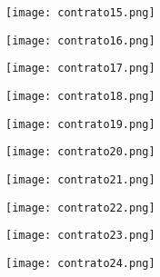 \documentclass[12pt, spanish]{article}
\begin{document}
\begin{centering}\texttt{[image: contrato15.png]}\\[1.0 cm]\end{centering}
\begin{centering}\texttt{[image: contrato16.png]}\\[1.0 cm]\end{centering}
\begin{centering}\texttt{[image: contrato17.png]}\\[1.0 cm]\end{centering}
\begin{centering}\texttt{[image: contrato18.png]}\\[1.0 cm]\end{centering}
\begin{centering}\texttt{[image: contrato19.png]}\\[1.0 cm]\end{centering}
\begin{centering}\texttt{[image: contrato20.png]}\\[1.0 cm]\end{centering}
\begin{centering}\texttt{[image: contrato21.png]}\\[1.0 cm]\end{centering}
\begin{centering}\texttt{[image: contrato22.png]}\\[1.0 cm]\end{centering}
\begin{centering}\texttt{[image: contrato23.png]}\\[1.0 cm]\end{centering}
\begin{centering}\texttt{[image: contrato24.png]}\\[1.0 cm]\end{centering}
\end{document}
